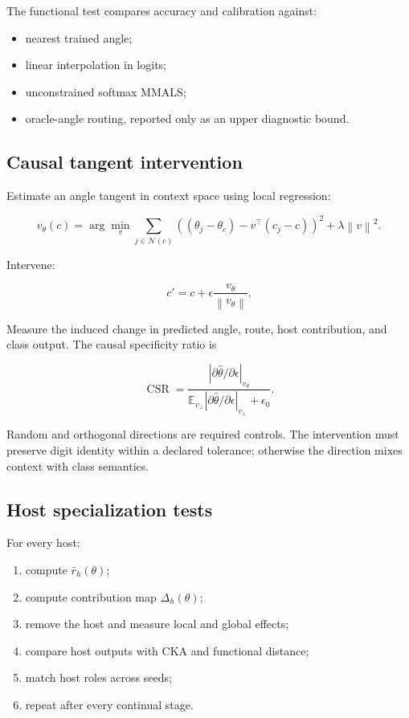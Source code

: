 \documentclass[11pt,a4paper]{article}
\newcommand{\E}{\mathbb{E}}
\newcommand{\norm}[1]{\left\lVert #1 \right\rVert}
\begin{document}
The functional test compares accuracy and calibration against:

\begin{itemize}
\item nearest trained angle;
\item linear interpolation in logits;
\item unconstrained softmax MMALS;
\item oracle-angle routing, reported only as an upper diagnostic bound.
\end{itemize}

\subsection{Causal tangent intervention}

Estimate an angle tangent in context space using local regression:

\begin{equation}
 v_\theta(c)=\arg\min_v\sum_{j\in\mathcal{N}(c)}
 \left((\theta_j-\theta_c)-v^\top(c_j-c)\right)^2+\lambda\norm v^2.
\end{equation}

Intervene:

\begin{equation}
 c'=c+\epsilon\frac{v_\theta}{\norm{v_\theta}}.
\end{equation}

Measure the induced change in predicted angle, route, host contribution, and class output. The causal specificity ratio is

\begin{equation}
 \operatorname{CSR}=\frac{\left|\partial \hat\theta/\partial\epsilon\right|_{v_\theta}}
 {\E_{v_\perp}\left|\partial \hat\theta/\partial\epsilon\right|_{v_\perp}+\epsilon_0}.
\end{equation}

Random and orthogonal directions are required controls. The intervention must preserve digit identity within a declared tolerance; otherwise the direction mixes context with class semantics.

\subsection{Host specialization tests}

For every host:

\begin{enumerate}
\item compute \(\bar r_h(\theta)\);
\item compute contribution map \(\Delta_h(\theta)\);
\item remove the host and measure local and global effects;
\item compare host outputs with CKA and functional distance;
\item match host roles across seeds;
\item repeat after every continual stage.
\end{enumerate}
\end{document}
